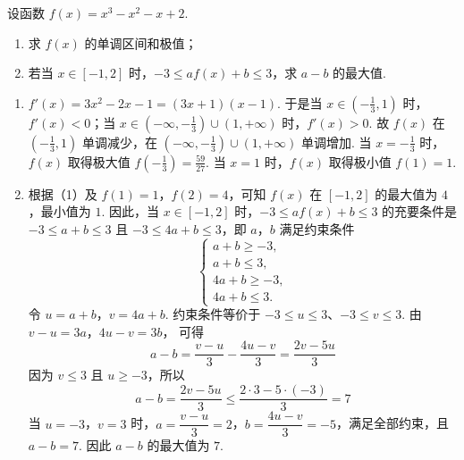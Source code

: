 \begin{problem}
设函数 \(f(x)=x^3-x^2-x+2\).

\begin{enumerate}
\item 求 \(f(x)\) 的单调区间和极值；

\item 若当 \(x\in[-1,2]\) 时，\(-3\le af(x)+b\le 3\)，求 \(a-b\) 的最大值.
\end{enumerate}
\end{problem}

\begin{solution}
\begin{enumerate}
\item \(f'(x)=3x^2-2x-1=(3x+1)(x-1)\). 于是当 \(x\in\left(-\frac{1}{3},1\right)\) 时，\(f'(x)<0\)；当 \(x\in\left(-\infty,-\frac{1}{3}\right)\cup(1,+\infty)\) 时，\(f'(x)>0\). 故 \(f(x)\) 在 \(\left(-\frac{1}{3},1\right)\) 单调减少，在 \(\left(-\infty,-\frac{1}{3}\right)\cup(1,+\infty)\) 单调增加. 当 \(x=-\frac{1}{3}\) 时，\(f(x)\) 取得极大值 \(f\left(-\frac{1}{3}\right)=\frac{59}{27}\). 当 \(x=1\) 时，\(f(x)\) 取得极小值 \(f(1)=1\).

\item 根据（1）及 \(f(1)=1\)，\(f(2)=4\)，可知 \(f(x)\) 在 \([-1,2]\) 的最大值为 \(4\)，最小值为 \(1\). 因此，当 \(x\in[-1,2]\) 时，\(-3\le af(x)+b\le 3\) 的充要条件是 \(-3\le a+b\le 3\) 且 \(-3\le 4a+b\le 3\)，即 \(a\)，\(b\) 满足约束条件
\[
\begin{cases}
a+b\ge -3,\\
a+b\le 3,\\
4a+b\ge -3,\\
4a+b\le 3.
\end{cases}
\]
令 \(u=a+b\)，\(v=4a+b\).
约束条件等价于 \(-3\le u\le3\)、\(-3\le v\le3\). 由 \(v-u=3a\)，\(4u-v=3b\)，
可得
\[
a-b=\frac{v-u}{3}-\frac{4u-v}{3}=\frac{2v-5u}{3}
\]
因为 \(v\le3\) 且 \(u\ge-3\)，所以
\[
a-b=\frac{2v-5u}{3}\le\frac{2\cdot3-5\cdot(-3)}{3}=7
\]
当 \(u=-3\)，\(v=3\) 时，\(a=\dfrac{v-u}{3}=2\)，\(b=\dfrac{4u-v}{3}=-5\)，满足全部约束，且 \(a-b=7\). 因此 \(a-b\) 的最大值为 \(7\).
\end{enumerate}
\end{solution}

